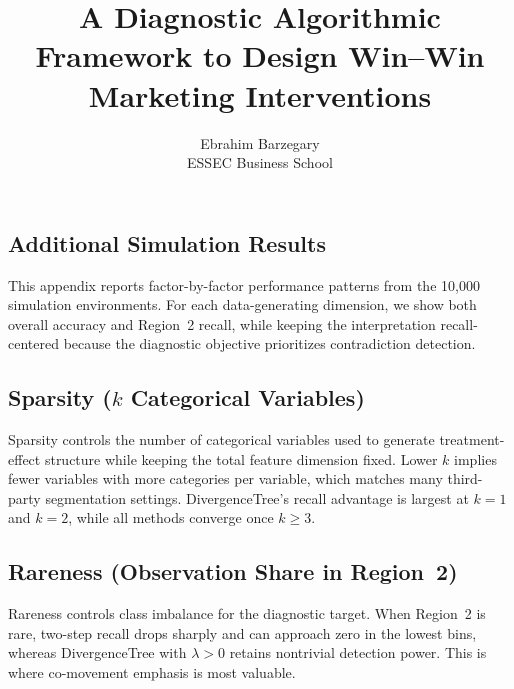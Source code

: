 \documentclass[11pt,letterpaper,english]{article}
\theoremstyle{definition}
\theoremstyle{definition}
\begin{document}
\begin{bibunit}

\newpage

\setcounter{table}{0}
\setcounter{page}{1}
\setcounter{figure}{0}
\setcounter{equation}{0}
\setcounter{footnote}{0}
\renewcommand{\thetable}{A\arabic{table}}
\renewcommand{\thefigure}{A\arabic{figure}}
\renewcommand{\theequation}{A.\arabic{equation}}
\renewcommand{\thepage}{\roman{page}}
\title{A Diagnostic Algorithmic Framework to Design Win--Win Marketing Interventions}


\author{
       Ebrahim Barzegary \\
        ESSEC Business School\\
 }

\begin{appendices}

\section{Additional Simulation Results}
\label{app:simulation-details}

This appendix reports factor-by-factor performance patterns from the 10{,}000 simulation environments. For each data-generating dimension, we show both overall accuracy and Region~2 recall, while keeping the interpretation recall-centered because the diagnostic objective prioritizes contradiction detection.

\subsection{Sparsity ($k$ Categorical Variables)}
Sparsity controls the number of categorical variables used to generate treatment-effect structure while keeping the total feature dimension fixed. Lower $k$ implies fewer variables with more categories per variable, which matches many third-party segmentation settings. DivergenceTree's recall advantage is largest at $k=1$ and $k=2$, while all methods converge once $k \ge 3$.


\subsection{Rareness (Observation Share in Region~2)}
Rareness controls class imbalance for the diagnostic target. When Region~2 is rare, two-step recall drops sharply and can approach zero in the lowest bins, whereas DivergenceTree with $\lambda>0$ retains nontrivial detection power. This is where co-movement emphasis is most valuable.



\end{appendices}
\end{bibunit}
\end{document}
